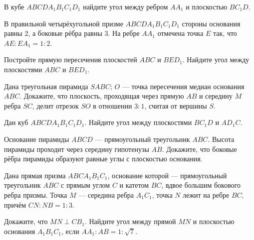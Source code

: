 \begin{class}[number=7]
	\begin{listofex}
		\item В кубе \(ABCDA_1B_1C_1D_1\) найдите угол между ребром \(AA_1\) и плоскостью \(BC_1D\).
		\item В правильной четырёхугольной призме \(ABCDA_1B_1C_1D_1\) стороны основания равны \(2\), а боковые рёбра равны \(3\). На ребре \(AA_1\) отмечена точка \(E\) так, что \(AE : EA_1=1 : 2\).
		\begin{tasks}
			\task Постройте прямую пересечения плоскостей \(ABC\) и \(BED_1\).
			\task Найдите угол между плоскостями \(ABC\) и \(BED_1\).
		\end{tasks}
		\item Дана треугольная пирамида \(SABC\); \(O\) --- точка пересечения медиан основания \(ABC\). Докажите, что плоскость, проходящая через прямую \(AB\) и середину \(M\) ребра \(SC\), делит отрезок \(SO\) в отношении \(3 : 1\), считая от вершины \(S\).
	\end{listofex}
\end{class}

\begin{class}[number=8]
	\begin{listofex}
		\item Дан куб \(ABCDA_1B_1C_1D_1\). Найдите угол между плоскостями \(BC_1D\) и \(AD_1C\).
		\item Основание пирамиды \(ABCD\) --- прямоугольный треугольник \(ABC\). Высота пирамиды проходит через середину гипотенузы \(AB\). Докажите, что боковые рёбра пирамиды образуют равные углы с плоскостью основания.
		\item Дана прямая призма \(ABCA_1B_1C_1\), основание которой --- прямоугольный треугольник \(ABC\) с прямым углом \(C\) и катетом \(BC\), вдвое большим бокового ребра призмы. Точка \(M\) --- середина ребра \(A_1C_1\), точка \(N\) лежит на ребре \(BC\), причём \(CN : NB=1 : 3\).
		\begin{tasks}
			\task Докажите, что \(MN \perp CB_1\).
			\task Найдите угол между прямой \(MN\) и плоскостью основания \(A_1B_1C_1\), если \(AA_1 : AB = 1 :\sqrt{7}\).
		\end{tasks}
	\end{listofex}
\end{class}

